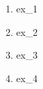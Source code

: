 \begin{enumerate}
	\item {} {ex_1} 
	\item {} {ex_2} 
	\item {} {ex_3} 
	\item {} {ex_4} 
\end{enumerate}